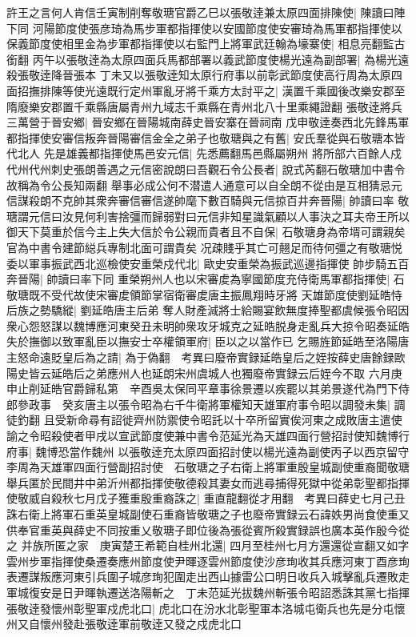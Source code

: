 許王之言何人肯信壬寅制削奪敬瑭官爵乙巳以張敬逹兼太原四面排陳使|{
	陳讀曰陣下同}
河陽節度使張彦琦為馬步軍都指揮使以安國節度使安審琦為馬軍都指揮使以保義節度使相里金為步軍都指揮使以右監門上將軍武廷翰為壕寨使|{
	相息亮翻監古銜翻}
丙午以張敬逹為太原四面兵馬都部署以義武節度使楊光遠為副部署|{
	為楊光遠殺張敬逹降晉張本}
丁未又以張敬逹知太原行府事以前彰武節度使高行周為太原四面招撫排陳等使光遠既行定州軍亂牙將千乘方太討平之|{
	漢置千乘國後改樂安郡至隋廢樂安郡置千乘縣唐屬青州九域志千乘縣在青州北八十里乘繩證翻}
張敬逹將兵三萬營于晉安鄉|{
	晉安鄉在晉陽城南薛史晉安寨在晉祠南}
戊申敬逹奏西北先鋒馬軍都指揮使安審信叛奔晉陽審信金全之弟子也敬瑭與之有舊|{
	安氏羣從與石敬瑭本皆代北人}
先是雄義都指揮使馬邑安元信|{
	先悉薦翻馬邑縣屬朔州}
將所部六百餘人戍代州代州刺史張朗善遇之元信密說朗曰吾觀石令公長者|{
	說式芮翻石敬瑭加中書令故稱為令公長知兩翻}
舉事必成公何不潜遣人通意可以自全朗不從由是互相猜忌元信謀殺朗不克帥其衆奔審信審信遂帥麾下數百騎與元信掠百井奔晉陽|{
	帥讀曰率}
敬瑭謂元信曰汝見何利害捨彊而歸弱對曰元信非知星識氣顧以人事決之耳夫帝王所以御天下莫重於信今主上失大信於令公親而貴者且不自保|{
	石敬瑭身為帝壻可謂親矣官為中書令建節縂兵專制北面可謂貴矣}
况疎賤乎其亡可翹足而待何彊之有敬瑭悦委以軍事振武西北巡檢使安重榮戍代北|{
	歐史安重榮為振武巡邊指揮使}
帥步騎五百奔晉陽|{
	帥讀曰率下同}
重榮朔州人也以宋審䖍為寧國節度充侍衛馬軍都指揮使|{
	石敬瑭既不受代故使宋審䖍領節掌宿衛審䖍唐主振鳳翔時牙將}
天雄節度使劉延皓恃后族之勢驕縱|{
	劉延皓唐主后弟}
奪人財產減將士給賜宴飲無度捧聖都虞候張令昭因衆心怨怒謀以魏博應河東癸丑未明帥衆攻牙城克之延皓脱身走亂兵大掠令昭奏延皓失於撫御以致軍亂臣以撫安士卒權領軍府|{
	臣以之以當作已}
乞賜旌節延皓至洛陽唐主怒命遠貶皇后為之請|{
	為于偽翻　考異曰廢帝實録延皓皇后之姪按薛史唐餘録歐陽史皆云延皓后之弟應州人也延朗宋州虞城人也獨廢帝實録云后姪今不取}
六月庚申止削延皓官爵歸私第　辛酉吳太保同平章事徐景遷以疾罷以其弟景遂代為門下侍郎參政事　癸亥唐主以張令昭為右千牛衛將軍權知天雄軍府事令昭以調發未集|{
	調徒釣翻}
且受新命尋有詔徙齊州防禦使令昭託以十卒所留實俟河東之成敗唐主遣使諭之令昭殺使者甲戌以宣武節度使兼中書令范延光為天雄四面行營招討使知魏博行府事|{
	魏博恐當作魏州}
以張敬逹充太原四面招討使以楊光遠為副使丙子以西京留守李周為天雄軍四面行營副招討使　石敬瑭之子右衛上將軍重殷皇城副使重裔聞敬瑭舉兵匿於民間井中弟沂州都指揮使敬德殺其妻女而逃尋捕得死獄中從弟彰聖都指揮使敬威自殺秋七月戊子獲重殷重裔誅之|{
	重直龍翻從才用翻　考異曰薛史七月己丑誅右衛上將軍石重英皇城副使石重裔皆敬瑭之子也廢帝實録云石諱妷男尚食使重又供奉官重英與薛史不同按重乂敬瑭子即位後為張從賓所殺實録誤也廣本英作殷今從之}
并族所匿之家　庚寅楚王希範自桂州北還|{
	四月至桂州七月方還還從宣翻又如字}
雲州步軍指揮使桑遷奏應州節度使尹暉逐雲州節度使沙彦珣收其兵應河東丁酉彦珣表遷謀叛應河東引兵圍子城彦珣犯圍走出西山據雷公口明日收兵入城擊亂兵遷敗走軍城復安是日尹暉執遷送洛陽斬之　丁未范延光拔魏州斬張令昭詔悉誅其黨七指揮　張敬逹發懷州彰聖軍戍虎北口|{
	虎北口在汾水北彰聖軍本洛城屯衛兵也先是分屯懷州又自懷州發赴張敬逹軍前敬逹又發之戍虎北口}

